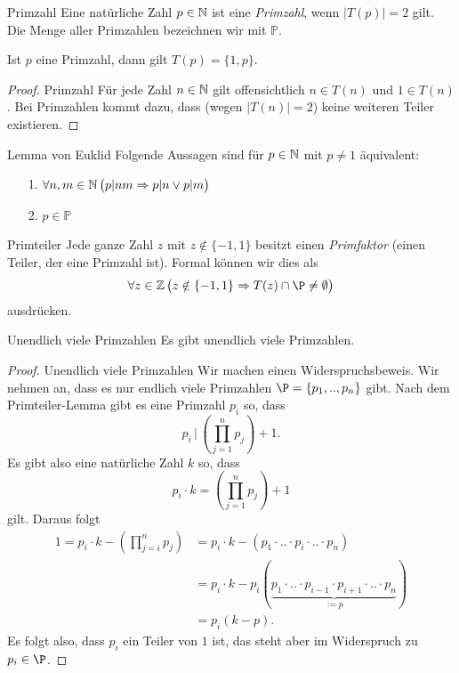 \begin{definition}{Primzahl}
    Eine natürliche Zahl $p\in\mathbb{N}$ ist eine \textit{Primzahl}, wenn $|T(p)|=2$ gilt. Die Menge aller Primzahlen bezeichnen wir mit $\mathbb{P}$.
\end{definition}

\begin{remark}
    Ist $p$ eine Primzahl, dann gilt $T(p)=\{1,p\}$.
\end{remark}

\begin{proof}{Primzahl}
    Für jede Zahl $n\in\mathbb{N}$ gilt offensichtlich $n\in T(n)$ und $1\in T(n)$. Bei Primzahlen kommt dazu, dass (wegen $|T(n)|=2$) keine weiteren Teiler existieren.
\end{proof}

\begin{lemma}{Lemma von Euklid}
    Folgende Aussagen sind für $p\in\mathbb{N}$ mit $p\neq 1$ äquivalent:
    \begin{enumerate}
        \item[1.] $\forall n,m\in\mathbb{N}\,\big(p|nm\Rightarrow p|n\vee p|m\big)$
        \item[2.] $p\in\mathbb{P}$
    \end{enumerate}
\end{lemma}

\begin{lemma}{Primteiler}
    Jede ganze Zahl $z$ mit $z\notin\{-1,1\}$ besitzt einen \textit{Primfaktor} (einen Teiler, der eine Primzahl ist). Formal können wir dies als
    \[
        \forall z\in\Z\,\big(z\notin\{-1,1\}\Rightarrow T(z)\cap\P\neq\emptyset\big)
    \]
    ausdrücken.
\end{lemma}

\begin{theorem}{Unendlich viele Primzahlen}
    Es gibt unendlich viele Primzahlen.
\end{theorem}

\begin{proof}{Unendlich viele Primzahlen}
    Wir machen einen Widerspruchsbeweis. Wir nehmen an, dass es nur endlich viele Primzahlen $\P=\{p_1,..,p_n\}$ gibt. Nach dem Primteiler-Lemma gibt es eine Primzahl $p_i$ so, dass
    \[
        p_i\,|\,(\prod_{j=1}^np_j)+1.
    \]
    Es gibt also eine natürliche Zahl $k$ so, dass
    \[
        p_i\cdot k=(\prod_{j=1}^np_j)+1
    \]
    gilt. Daraus folgt
    \begin{align*}
        1=p_i\cdot k-(\prod_{j=i}^np_j)&=p_i\cdot k-(p_1\cdot..\cdot p_i\cdot..\cdot p_n)\\
        &=p_i\cdot k-p_i(\underbrace{p_1\cdot..\cdot p_{i-1}\cdot p_{i+1}\cdot..\cdot p_n}_{:=p})\\
        &=p_i(k-p).
    \end{align*}
    Es folgt also, dass $p_i$ ein Teiler von $1$ ist, das steht aber im Widerspruch zu $p_i\in\P$.
\end{proof}

